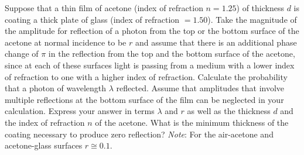 \documentclass[12pt,letterpaper,boxed,cm]{hmcpset}
\begin{document}
	
\begin{problem}[Townsend 1.25*]
	Suppose that a thin film of acetone (index of refraction $n = 1.25$) of thickness $d$ is coating a thick plate of glass (index of refraction $= 1.50$). Take the magnitude of the amplitude for reflection of a photon from the top or the bottom surface of the acetone at normal incidence to be $r$ and assume that there is an additional phase change of $\pi$ in the reflection from the top and the bottom surface of the acetone, since at each of these surfaces light is passing from a medium with a lower index of refraction to one with a higher index of refraction. Calculate the probability that a photon of wavelength $\lambda$ reflected. Assume that amplitudes that involve multiple reflections at the bottom surface of the film can be neglected in your calculation. Express your answer in terms $\lambda$ and $r$ as well as the thickness $d$ and the index of refraction $n$ of the acetone. What is the minimum thickness of the coating necessary to produce zero reflection? \textit{Note}: For the air-acetone and acetone-glass surfaces $r \cong 0.1$.
\end{problem}
\begin{solution}
\end{solution}
\newpage
\end{document}
